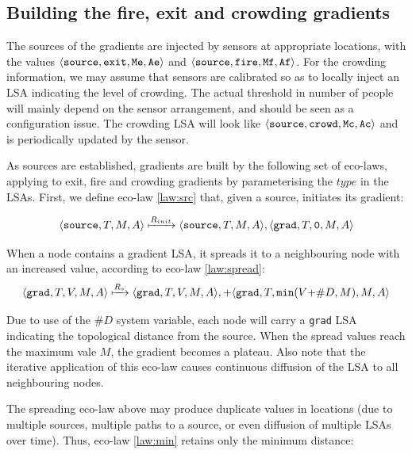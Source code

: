 \documentclass[12pt,a4paper,twoside,openright]{book}
\begin{document}
\subsection{Building the fire, exit and crowding gradients}

The sources of the gradients are injected by sensors at appropriate locations, with the values 
$\langle \mathtt{source}, \mathtt{exit}, \mathtt{Me}, \mathtt{Ae}\rangle$ and
$\langle \mathtt{source}, \mathtt{fire}, \mathtt{Mf}, \mathtt{Af}\rangle$.
%
For the crowding information, we may assume that sensors are calibrated so as to locally inject an LSA indicating the level of crowding. The actual threshold in number of people will mainly depend on the sensor arrangement, and should be seen as a configuration issue. The crowding LSA will look like $\langle \mathtt{source}, \mathtt{crowd}, \mathtt{Mc}, \mathtt{Ac}\rangle$ and is periodically updated by the sensor.

As sources are established, gradients are built by the following set of eco-laws, applying to exit, fire and crowding gradients by parameterising the $type$ in the LSAs.
%
First, we define eco-law \ref{law:src} that, given a source, initiates its gradient:

\begin{equation}\label{law:src}
\langle \mathtt{source}, T, M, A\rangle \xmapsto{R_{init}} \langle \mathtt{source}, T, M, A\rangle, \langle \mathtt{grad}, T, \mathtt{0}, M, A\rangle
\end{equation}

\noindent When a node contains a gradient LSA, it spreads it to a neighbouring node with an increased value, according to eco-law \ref{law:spread}:
\begin{equation}\label{law:spread}
\langle \mathtt{grad}, T, V, M, A\rangle \xmapsto{R_{s}}  \langle \mathtt{grad}, T, V, M, A\rangle, +\langle \mathtt{grad}, T, \mathtt{min(}V\mathit{+}\#D, M\mathtt{)}, M, A\rangle
\end{equation}

\noindent Due to use of the $\#D$ system variable, each node will carry a \texttt{grad} LSA indicating the topological distance from the source. When the spread values reach the maximum vale $M$, the gradient becomes a plateau. 
%
Also note that the iterative application of this eco-law causes continuous diffusion of the LSA to all neighbouring nodes. 

The spreading eco-law above  may produce duplicate values in locations (due to multiple sources, multiple paths to a source, or even diffusion of multiple LSAs over time).
%
Thus,  eco-law \ref{law:min}  retains only the minimum distance:
\end{document}
